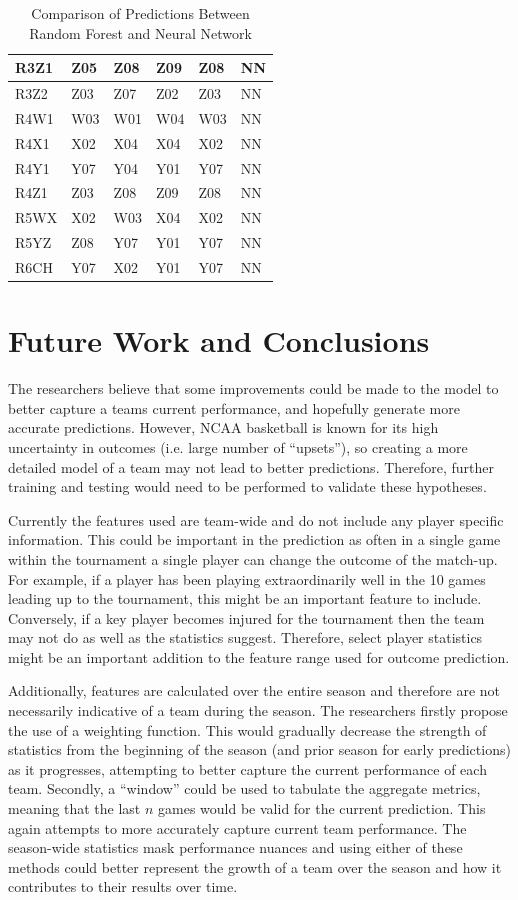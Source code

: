 \documentclass[conference]{IEEEtran}
\begin{document}
{\begin{table}[H]
\begin{tabular}{|l|l|l|l|l|l|}
R3Z1 & Z05 & Z08 & Z09 & Z08 &  NN  \\ \hline
R3Z2 & Z03 & Z07 & Z02 & Z03 &  NN  \\ \hline
R4W1 & W03 & W01 & W04 & W03 &  NN  \\ \hline
R4X1 & X02 & X04 & X04 & X02 &  NN  \\ \hline
R4Y1 & Y07 & Y04 & Y01 & Y07 &  NN  \\ \hline
R4Z1 & Z03 & Z08 & Z09 & Z08 &  NN  \\ \hline
R5WX & X02 & W03 & X04 & X02 &  NN  \\ \hline
R5YZ & Z08 & Y07 & Y01 & Y07 &  NN  \\ \hline
R6CH & Y07 & X02 & Y01 & Y07 &  NN  \\ \hline
    \end{tabular}
    \caption {Comparison of Predictions Between Random Forest and Neural Network}
    \label{tab:comparison}
\end{table}

\section{Future Work and Conclusions}
The researchers believe that some improvements could be made to the model to better capture a teams current performance, and hopefully generate more accurate predictions. 
However, NCAA basketball is known for its high uncertainty in outcomes (i.e. large number of ``upsets''), so creating a more detailed model of a team may not lead to better predictions.
Therefore, further training and testing would need to be performed to validate these hypotheses.

Currently the features used are team-wide and do not include any player specific information. 
This could be important in the prediction as often in a single game within the tournament a single player can change the outcome of the match-up.
For example, if a player has been playing extraordinarily well in the 10 games leading up to the tournament, this might be an important feature to include.
Conversely, if a key player becomes injured for the tournament then the team may not do as well as the statistics suggest.
Therefore, select player statistics might be an important addition to the feature range used for outcome prediction.

Additionally, features are calculated over the entire season and therefore are not necessarily indicative of a team during the season. 
The researchers firstly propose the use of a weighting function. 
This would gradually decrease the strength of statistics from the beginning of the season (and prior season for early predictions) as it progresses, attempting to better capture the current performance of each team. 
Secondly, a ``window'' could be used to tabulate the aggregate metrics, meaning that the last $n$ games would be valid for the current prediction. 
This again attempts to more accurately capture current team performance. 
The season-wide statistics mask performance nuances and using either of these methods could better represent the growth of a team over the season and how it contributes to their results over time.

}
\end{document}
